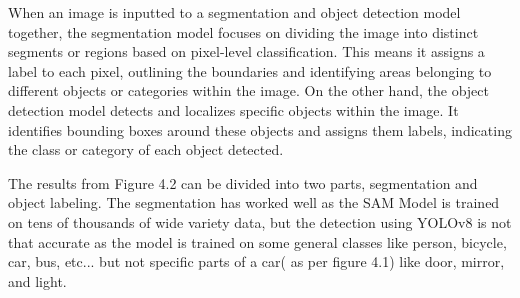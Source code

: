 \noindent
When an image is inputted to a segmentation and object detection model together, the segmentation model focuses on dividing the image into distinct segments or regions based on pixel-level classification. This means it assigns a label to each pixel, outlining the boundaries and identifying areas belonging to different objects or categories within the image. On the other hand, the object detection model detects and localizes specific objects within the image. It identifies bounding boxes around these objects and assigns them labels, indicating the class or category of each object detected.

\noindent
The results from Figure 4.2 can be divided into two parts, segmentation and object labeling. The segmentation has worked well as the SAM Model is trained on tens of thousands of wide variety data, but the detection using YOLOv8 is not that accurate as the model is trained on some general classes like person, bicycle, car, bus, etc... but not specific parts of a car( as per figure 4.1) like door, mirror, and light. 